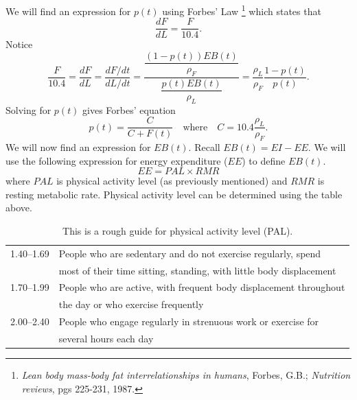 We will find an expression for $p(t)$ using Forbes' Law%
 \footnote{\emph{Lean body mass-body fat interrelationships in humans}, Forbes, G.B.; \emph{ Nutrition reviews}, pgs 225-231, 1987.}
which states that $$\frac{dF}{dL}=\frac{F}{10.4}.$$ Notice
\[
\dfrac{F}{10.4} = \dfrac{dF}{dL} = \dfrac{dF/dt}{dL/dt} = \dfrac{\dfrac{(1-p(t)) EB(t)}{\rho_F}}{\dfrac{p(t) EB(t)}{\rho_L}} = \dfrac{\rho_L}{\rho_F} \dfrac{1-p(t)}{p(t)}.
\]
Solving for $p(t)$ gives Forbes' equation
\begin{equation}
\label{eqn:Forbes2}
p(t) = \dfrac{C}{C+F(t)}\quad\mbox{where}\quad C=10.4\dfrac{\rho_L}{\rho_F}.
\end{equation}
We will now find an expression for $EB(t)$. Recall $EB(t)=EI-EE$. We will use the following expression for energy expenditure ($EE$) to define $EB(t)$. 
\begin{equation}
\label{eqn:EE1}
EE=PAL \times RMR
\end{equation}
where $PAL$ is physical activity level (as previously mentioned) and $RMR$ is resting metabolic rate. 
Physical activity level can be determined using the table above.
\begin{table}[h]
\begin{center}
\begin{tabular}{|l|l|}
\hline
1.40--1.69 & People who are sedentary and do not exercise regularly, spend \\
& most of their time sitting, standing, with little body displacement
\\
\hline
1.70--1.99 & People who are active, with frequent body displacement throughout  \\
& the day or who exercise frequently\\
\hline
2.00--2.40 & People who engage regularly in strenuous work or exercise for \\
& several hours each day\\
\hline
\end{tabular}
\caption{This is a rough guide for physical activity level (PAL).
}
\end{center}\label{tab:PAL_table}
\end{table}

